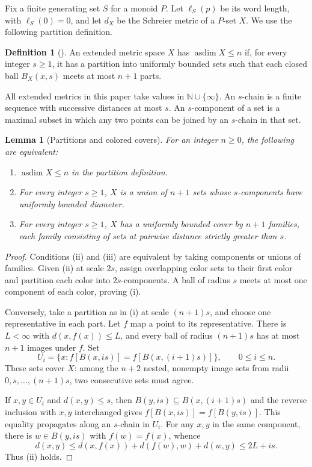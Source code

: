\documentclass[11pt,letterpaper]{article}
\newtheorem{lemma}[theorem]{Lemma}
\theoremstyle{definition}
\newtheorem{definition}[theorem]{Definition}
\DeclareMathOperator{\asdim}{asdim}
\newcommand{\NN}{\mathbb N}
\begin{document}
Fix a finite generating set $S$ for a monoid $P$. Let $\ell_S(p)$ be its
word length, with $\ell_S(0)=0$, and let $d_X$ be the Schreier metric of a
$P$-set $X$. We use the following partition definition.

\begin{definition}[\cite{CJMST}]
An extended metric space $X$ has $\asdim X\le n$ if, for every integer
$s\ge1$, it has a partition into uniformly bounded sets such that each
closed ball $B_X(x,s)$ meets at most $n+1$ parts.
\end{definition}

All extended metrics in this paper take values in $\NN\cup\{\infty\}$. An $s$-chain is a finite sequence with successive
distances at most $s$. An $s$-component of a set is a maximal subset in
which any two points can be joined by an $s$-chain in that set.

\begin{lemma}[Partitions and colored covers]\label{lem:colored}
For an integer $n\ge0$, the following are equivalent:
\begin{enumerate}[label=(\roman*),itemsep=0.15em,topsep=0.3em]
\item $\asdim X\le n$ in the partition definition.
\item For every integer $s\ge1$, $X$ is a union of $n+1$ sets whose
$s$-components have uniformly bounded diameter.
\item For every integer $s\ge1$, $X$ has a uniformly bounded cover by
$n+1$ families, each family consisting of sets at pairwise distance
strictly greater than $s$.
\end{enumerate}
\end{lemma}

\begin{proof}
Conditions (ii) and (iii) are equivalent by taking components or unions of
families. Given (ii) at scale $2s$, assign overlapping color sets to their
first color and partition each color into $2s$-components. A ball of
radius $s$ meets at most one component of each color, proving (i).

Conversely, take a partition as in (i) at scale $(n+1)s$, and choose one
representative in each part. Let $f$ map a point to its representative.
There is $L<\infty$ with $d(x,f(x))\le L$, and every ball of radius
$(n+1)s$ has at most $n+1$ images under $f$. Set
\[
 U_i=\{x:f[B(x,is)]=f[B(x,(i+1)s)]\},\qquad 0\le i\le n.
\]
These sets cover $X$: among the $n+2$ nested, nonempty image sets from
radii $0,s,\ldots,(n+1)s$, two consecutive sets must agree.

If $x,y\in U_i$ and $d(x,y)\le s$, then
$B(y,is)\subseteq B(x,(i+1)s)$ and the reverse inclusion with $x,y$
interchanged gives
$f[B(x,is)]=f[B(y,is)]$. This equality propagates along an $s$-chain in
$U_i$. For any $x,y$ in the same component, there is
$w\in B(y,is)$ with $f(w)=f(x)$, whence
\[
 d(x,y)\le d(x,f(x))+d(f(w),w)+d(w,y)\le2L+is.
\]
Thus (ii) holds.
\end{proof}
\end{document}
